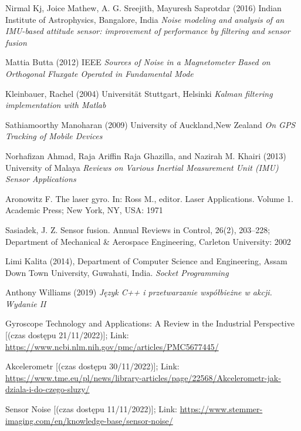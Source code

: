 \begin{thebibliography}{9}
    Nirmal Kj, Joice Mathew, A. G. Sreejith, Mayuresh Saprotdar (2016) Indian Institute of Astrophysics, Bangalore, India \emph{Noise modeling and analysis of an IMU-based attitude sensor: improvement of performance by filtering and sensor fusion}

    Mattia Butta (2012) IEEE \emph{Sources of Noise in a Magnetometer Based on Orthogonal Fluxgate Operated in Fundamental Mode}

    Kleinbauer, Rachel (2004) Universität Stuttgart, Helsinki \emph{Kalman filtering implementation with Matlab}

    Sathiamoorthy Manoharan (2009) University of Auckland,New Zealand \emph{On GPS Tracking of Mobile Devices}

     Norhafizan Ahmad, Raja Ariffin Raja Ghazilla, and Nazirah M. Khairi (2013) University of Malaya \emph{Reviews on Various Inertial Measurement Unit (IMU) Sensor Applications}

    {Aronowitz F. The laser gyro. In: Ross M., editor. Laser Applications. Volume 1. Academic Press; New York, NY, USA: 1971}

    {Sasiadek, J. Z. Sensor fusion. Annual Reviews in Control, 26(2), 203–228; Department of Mechanical & Aerospace Engineering, Carleton University: 2002}

    Limi Kalita (2014), Department of Computer Science and Engineering,
    Assam Down Town University,
    Guwahati, India. \emph{Socket Programming}

    Anthony Williams (2019)
    \emph{Język C++ i przetwarzanie współbieżne w akcji. Wydanie II}

    Gyroscope Technology and Applications: A Review in the Industrial Perspective [(czas dostępu  21/11/2022)]; Link: 
    \url{https://www.ncbi.nlm.nih.gov/pmc/articles/PMC5677445/}

    Akcelerometr [(czas dostępu  30/11/2022)]; Link: 
    \url{https://www.tme.eu/pl/news/library-articles/page/22568/Akcelerometr-jak-dziala-i-do-czego-sluzy/}

    Sensor Noise [(czas dostępu  11/11/2022)]; Link: 
    \url{https://www.stemmer-imaging.com/en/knowledge-base/sensor-noise/}


\end{thebibliography}

